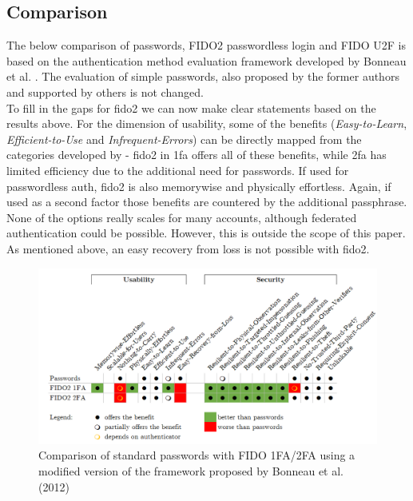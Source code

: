 \subsection{Comparison}
\label{subsec:comparison}

The below comparison of passwords, FIDO2 passwordless login and FIDO U2F is based on the authentication method evaluation framework developed by Bonneau et al. \cite{bonneau2012}. The evaluation of simple passwords, also proposed by the former authors and supported by others \cite{lyastani2020} is not changed.\\
To fill in the gaps for \ac{fido2} we can now make clear statements based on the results above. For the dimension of usability, some of the benefits (\emph{Easy-to-Learn}, \emph{Efficient-to-Use} and \emph{Infrequent-Errors}) can be directly mapped from the categories developed by \cite{nielsen1993} - \ac{fido2} in \ac{1fa} offers all of these benefits, while \ac{2fa} has limited efficiency due to the additional need for passwords. If used for passwordless auth, \ac{fido2} is also memorywise and physically effortless. Again, if used as a second factor those benefits are countered by the additional passphrase. None of the options really scales for many accounts, although federated authentication could be possible. However, this is outside the scope of this paper. As mentioned above, an easy recovery from loss is not possible with \ac{fido2}.

\begin{figure}[!ht]
    \centering
    \includegraphics[width=1.8\columnwidth]{Figures/bonneau_matrix.png}
    \caption[Comparison of Authentication Methods]{Comparison of standard passwords with FIDO 1FA/2FA using a modified version of the framework proposed by Bonneau et al. (2012)}
    \label{fig:bonneau_matrix}
\end{figure}

